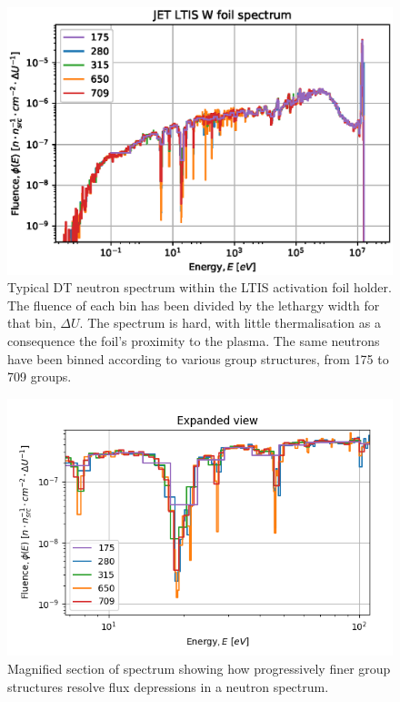 \begin{figure}[H]
  \centering
  \includegraphics[width=\linewidth]{W186_spectra_diff_groups.eps}
  \caption{Typical DT neutron spectrum within the LTIS activation foil holder. The fluence of each bin has been divided by the lethargy width for that bin, $\Delta U$. The spectrum is hard, with little thermalisation as a consequence the foil's proximity to the plasma. The same neutrons have been binned according to various group structures, from 175 to 709 groups.}
  \label{fig:spectrum}
\end{figure}

\begin{figure}[H]
  \centering
  \includegraphics[width=\linewidth]{w_spectrum_detail}
  \caption{Magnified section of spectrum showing how progressively finer group structures resolve flux depressions in a neutron spectrum.}
  \label{fig:spectrum_detail}
\end{figure}

